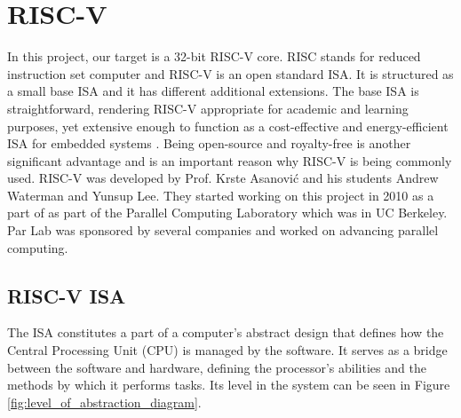 \clearpage
\chapter{RISC-V}\label{ch:riscv}
In this project, our target is a 32-bit RISC-V core. RISC stands for reduced instruction set computer and RISC-V is an open standard ISA. \cite{riscvorgabout} It is structured as a small base ISA and it has different additional extensions. The base ISA is straightforward, rendering RISC-V appropriate for academic and learning purposes, yet extensive enough to function as a cost-effective and energy-efficient ISA for embedded systems \cite{watermanriscv}. Being open-source and royalty-free is another significant advantage and is an important reason why RISC-V is being commonly used. 
RISC-V was developed by Prof. Krste Asanović and his students Andrew Waterman and Yunsup Lee. They started working on this project in 2010 as a part of as part of the Parallel Computing Laboratory which was in UC Berkeley. Par Lab was sponsored by several companies and worked on advancing parallel computing.

\section{RISC-V ISA}
The ISA constitutes a part of a computer’s abstract design that defines how the Central Processing Unit (CPU) is managed by the software. It serves as a bridge between the software and hardware, defining the processor’s abilities and the methods by which it performs tasks. Its level in the system can be seen in Figure \ref{fig:level_of_abstraction_diagram}.

